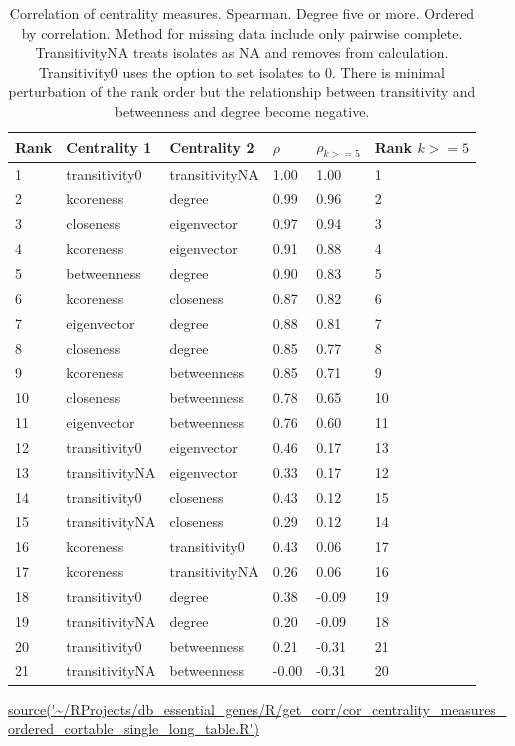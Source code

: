 \begin{table}[ht]
\centering
   \setlength{\extrarowheight}{2pt}
\begin{tabular}{llllll}
  \toprule
Rank  & Centrality 1 & Centrality 2 &$\rho$ & $\rho_{k>=5}$  & Rank $k>=5$ \\ 
  \midrule
1 & transitivity0 & transitivityNA & 1.00 & 1.00 & 1 \\ 
  2 & kcoreness & degree & 0.99 & 0.96 & 2 \\ 
  3 & closeness & eigenvector & 0.97 & 0.94 & 3 \\ 
  4 & kcoreness & eigenvector & 0.91 & 0.88 & 4 \\ 
  5 & betweenness & degree & 0.90 & 0.83 & 5 \\ 
  6 & kcoreness & closeness & 0.87 & 0.82 & 6 \\ 
  7 & eigenvector & degree & 0.88 & 0.81 & 7 \\ 
  8 & closeness & degree & 0.85 & 0.77 & 8 \\ 
  9 & kcoreness & betweenness & 0.85 & 0.71 & 9 \\ 
  10 & closeness & betweenness & 0.78 & 0.65 & 10 \\ 
  11 & eigenvector & betweenness & 0.76 & 0.60 & 11 \\ 
  12 & transitivity0 & eigenvector & 0.46 & 0.17 & 13 \\ 
  13 & transitivityNA & eigenvector & 0.33 & 0.17 & 12 \\ 
  14 & transitivity0 & closeness & 0.43 & 0.12 & 15 \\ 
  15 & transitivityNA & closeness & 0.29 & 0.12 & 14 \\ 
  16 & kcoreness & transitivity0 & 0.43 & 0.06 & 17 \\ 
  17 & kcoreness & transitivityNA & 0.26 & 0.06 & 16 \\ 
  18 & transitivity0 & degree & 0.38 & -0.09 & 19 \\ 
  19 & transitivityNA & degree & 0.20 & -0.09 & 18 \\ 
  20 & transitivity0 & betweenness & 0.21 & -0.31 & 21 \\ 
  21 & transitivityNA & betweenness & -0.00 & -0.31 & 20 \\ 
   \bottomrule
\end{tabular}
\caption[Comparison of correlation coefficients for all nodes and nodes with degree greater than or equal to five]{Correlation of centrality measures. Spearman. Degree five or more. Ordered by correlation. Method for missing data include only pairwise complete. TransitivityNA treats isolates as NA and removes from calculation. Transitivity0 uses the option to set isolates to 0. There is minimal perturbation of the rank order but the relationship between transitivity and betweenness and degree become negative.}
\tiny\url{source('~/RProjects/db_essential_genes/R/get_corr/cor_centrality_measures_ordered_cortable_single_long_table.R')}
\label{tab:correlation and rank centrality five or more}
\end{table}


